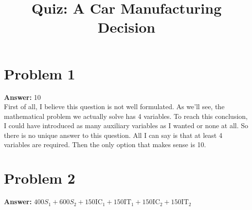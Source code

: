 \documentclass[11pt]{article}
\date{}
\title{Quiz: A Car Manufacturing Decision}
\begin{document}
\thispagestyle{empty}
\pagestyle{empty}
\section*{Problem 1}
\label{sec:org63c7681}

\textbf{Answer:} 10\\

First of all, I believe this question is not well formulated. As we'll see, the
mathematical problem we actually solve has 4 variables. To reach this
conclusion, I could have introduced as many auxiliary variables as I wanted or
none at all. So there is no unique answer to this question. All I can say is
that at least 4 variables are required. Then the only option that makes sense
is 10.
\section*{Problem 2}
\label{sec:orgaf27610}

\textbf{Answer:} \(400S_1+600S_2+150\mathrm{IC}_1+150\mathrm{IT}_1+150\mathrm{IC}_2+150\mathrm{IT}_2\)\\
\end{document}
